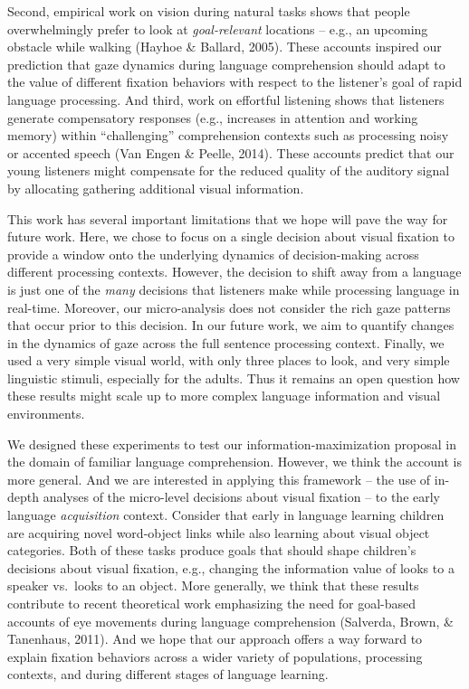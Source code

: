 \documentclass[10pt, letterpaper]{article}
\begin{document}
Second, empirical work on vision during natural tasks shows that people
overwhelmingly prefer to look at \emph{goal-relevant} locations -- e.g.,
an upcoming obstacle while walking (Hayhoe \& Ballard, 2005). These
accounts inspired our prediction that gaze dynamics during language
comprehension should adapt to the value of different fixation behaviors
with respect to the listener's goal of rapid language processing. And
third, work on effortful listening shows that listeners generate
compensatory responses (e.g., increases in attention and working memory)
within ``challenging'' comprehension contexts such as processing noisy
or accented speech (Van Engen \& Peelle, 2014). These accounts predict
that our young listeners might compensate for the reduced quality of the
auditory signal by allocating gathering additional visual information.

This work has several important limitations that we hope will pave the
way for future work. Here, we chose to focus on a single decision about
visual fixation to provide a window onto the underlying dynamics of
decision-making across different processing contexts. However, the
decision to shift away from a language is just one of the \emph{many}
decisions that listeners make while processing language in real-time.
Moreover, our micro-analysis does not consider the rich gaze patterns
that occur prior to this decision. In our future work, we aim to
quantify changes in the dynamics of gaze across the full sentence
processing context. Finally, we used a very simple visual world, with
only three places to look, and very simple linguistic stimuli,
especially for the adults. Thus it remains an open question how these
results might scale up to more complex language information and visual
environments.

We designed these experiments to test our information-maximization
proposal in the domain of familiar language comprehension. However, we
think the account is more general. And we are interested in applying
this framework -- the use of in-depth analyses of the micro-level
decisions about visual fixation -- to the early language
\emph{acquisition} context. Consider that early in language learning
children are acquiring novel word-object links while also learning about
visual object categories. Both of these tasks produce goals that should
shape children's decisions about visual fixation, e.g., changing the
information value of looks to a speaker vs.~looks to an object. More
generally, we think that these results contribute to recent theoretical
work emphasizing the need for goal-based accounts of eye movements
during language comprehension (Salverda, Brown, \& Tanenhaus, 2011). And
we hope that our approach offers a way forward to explain fixation
behaviors across a wider variety of populations, processing contexts,
and during different stages of language learning.
\end{document}
